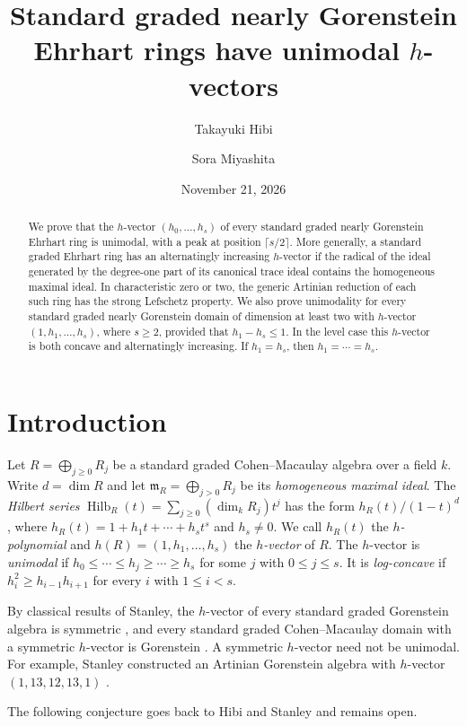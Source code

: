 \documentclass[a4paper,11pt]{amsart}
\title[Unimodality for nearly Gorenstein Ehrhart rings]{Standard graded nearly Gorenstein Ehrhart rings have unimodal $h$-vectors}
\author{Takayuki Hibi}
\author{Sora Miyashita}
\date{November 21, 2026}
\DeclareMathOperator{\Hilb}{Hilb}
\newcommand{\kk}{k}
\newcommand{\m}{\mathfrak{m}}
\theoremstyle{definition}
\begin{document}
\begin{abstract}
We prove that the $h$-vector $(h_0,\ldots,h_s)$ of every standard graded nearly Gorenstein Ehrhart ring is unimodal, with a peak at position $\lceil s/2\rceil$. More generally, a standard graded Ehrhart ring has an alternatingly increasing $h$-vector if the radical of the ideal generated by the degree-one part of its canonical trace ideal contains the homogeneous maximal ideal. In characteristic zero or two, the generic Artinian reduction of each such ring has the strong Lefschetz property. We also prove unimodality for every standard graded nearly Gorenstein domain of dimension at least two with $h$-vector $(1,h_1,\ldots,h_s)$, where $s\geq2$, provided that $h_1-h_s\leq1$. In the level case this $h$-vector is both concave and alternatingly increasing. If $h_1=h_s$, then $h_1=\cdots=h_s$.
\end{abstract}

\maketitle

\section{Introduction}

Let $R=\bigoplus_{j\geq0} R_j$ be a standard graded Cohen--Macaulay algebra over a field $\kk$. Write $d=\dim R$ and let $\m_R=\bigoplus_{j>0} R_j$ be its \emph{homogeneous maximal ideal}. The \emph{Hilbert series} $\Hilb_R(t)=\sum_{j\geq0}(\dim_{\kk} R_j)t^j$ has the form $h_R(t)/(1-t)^d$, where $h_R(t)=1+h_1t+\cdots+h_st^s$ and $h_s\neq0$. We call $h_R(t)$ the \emph{$h$-polynomial} and $h(R)=(1,h_1,\ldots,h_s)$ the \emph{$h$-vector} of $R$. The $h$-vector is \emph{unimodal} if $h_0\leq\cdots\leq h_j\geq\cdots\geq h_s$ for some $j$ with $0\leq j\leq s$. It is \emph{log-concave} if $h_i^2\geq h_{i-1}h_{i+1}$ for every $i$ with $1\leq i<s$.

By classical results of Stanley, the $h$-vector of every standard graded Gorenstein algebra is symmetric \cite[Theorem~4.1]{S78}, and every standard graded Cohen--Macaulay domain with a symmetric $h$-vector is Gorenstein \cite[Theorem~4.4]{S78}. A symmetric $h$-vector need not be unimodal. For example, Stanley constructed an Artinian Gorenstein algebra with $h$-vector $(1,13,12,13,1)$ \cite[Example~4.3]{S78}.

The following conjecture goes back to Hibi and Stanley and remains open.
\end{document}

